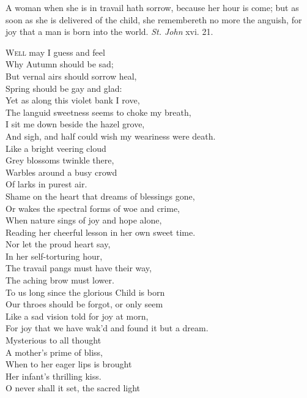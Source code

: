 A woman when she is in travail hath sorrow, because her hour is come; but as soon as she is delivered of the child, she remembereth no more the anguish, for joy that a man is born into the world. \emph{St. John} xvi. 21.

\textsc{Well} may I guess and feel \\
 Why Autumn should be sad; \\
 But vernal airs should sorrow heal, \\
 Spring should be gay and glad: \\
 Yet as along this violet bank I rove, \\
 The languid sweetness seems to choke my breath, \\
 I sit me down beside the hazel grove, \\
 And sigh, and half could wish my weariness were death. \\
  Like a bright veering cloud \\
 Grey blossoms twinkle there, \\
 Warbles around a busy crowd \\
 Of larks in purest air. \\
 Shame on the heart that dreams of blessings gone, \\
 Or wakes the spectral forms of woe and crime, \\
 When nature sings of joy and hope alone, \\
 Reading her cheerful lesson in her own sweet time. \\
  Nor let the proud heart say, \\
 In her self-torturing hour, \\
 The travail pangs must have their way, \\
 The aching brow must lower. \\
 To us long since the glorious Child is born \\
 Our throes should be forgot, or only seem \\
 Like a sad vision told for joy at morn, \\
 For joy that we have wak’d and found it but a dream. \\
  Mysterious to all thought \\
 A mother’s prime of bliss, \\
 When to her eager lips is brought \\
 Her infant’s thrilling kiss. \\
 O never shall it set, the sacred light \\
